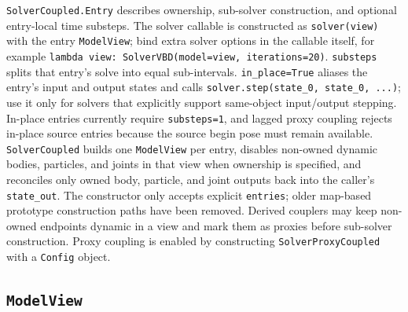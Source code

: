 \documentclass[11pt]{article}
\begin{document}
\texttt{SolverCoupled.Entry} describes ownership, sub-solver construction, and
optional entry-local time substeps. The solver callable is constructed as
\texttt{solver(view)} with the entry \texttt{ModelView}; bind extra solver
options in the callable itself, for example
\texttt{lambda view: SolverVBD(model=view, iterations=20)}. \texttt{substeps}
splits that entry's solve into equal sub-intervals. \texttt{in\_place=True}
aliases the entry's input and output states and calls
\texttt{solver.step(state\_0, state\_0, ...)}; use it only for solvers that
explicitly support same-object input/output stepping. In-place entries
currently require \texttt{substeps=1}, and lagged proxy coupling rejects
in-place source entries because the source begin pose must remain available.
\texttt{SolverCoupled} builds one \texttt{ModelView} per entry, disables
non-owned dynamic bodies, particles, and joints in that view when ownership is
specified, and reconciles only owned body, particle, and joint outputs back into
the caller's \texttt{state\_out}. The constructor only accepts explicit
\texttt{entries}; older map-based prototype construction paths have been
removed. Derived couplers may keep non-owned endpoints dynamic in a view and
mark them as proxies before sub-solver construction. Proxy coupling is enabled
by constructing \texttt{SolverProxyCoupled} with a \texttt{Config} object.

\subsection{\texttt{ModelView}}
\end{document}
